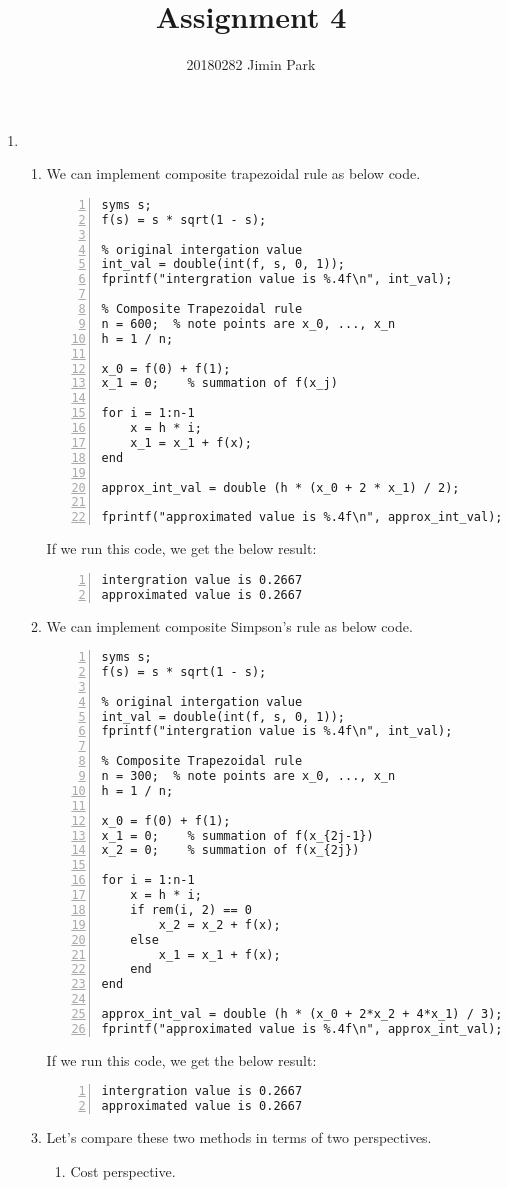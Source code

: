 \documentclass{article}
\begin{document}
\title{Assignment 4}
\author{20180282 Jimin Park}
\maketitle

\begin{enumerate}
    \item \begin{enumerate}[wide=10pt]
        \item We can implement composite trapezoidal rule as below code. \begin{lstlisting}[frame=single, numbers=left, style=Matlab-editor]
syms s;
f(s) = s * sqrt(1 - s);

% original intergation value
int_val = double(int(f, s, 0, 1));
fprintf("intergration value is %.4f\n", int_val);

% Composite Trapezoidal rule
n = 600;  % note points are x_0, ..., x_n
h = 1 / n;

x_0 = f(0) + f(1);
x_1 = 0;    % summation of f(x_j)

for i = 1:n-1
    x = h * i;
    x_1 = x_1 + f(x);
end

approx_int_val = double (h * (x_0 + 2 * x_1) / 2);

fprintf("approximated value is %.4f\n", approx_int_val);
        \end{lstlisting} If we run this code, we get the below result: \begin{lstlisting}[frame=single, numbers=left, style=Matlab-editor]
intergration value is 0.2667
approximated value is 0.2667
        \end{lstlisting}
        \item We can implement composite Simpson's rule as below code. \begin{lstlisting}[frame=single, numbers=left, style=Matlab-editor]
syms s;
f(s) = s * sqrt(1 - s);

% original intergation value
int_val = double(int(f, s, 0, 1));
fprintf("intergration value is %.4f\n", int_val);

% Composite Trapezoidal rule
n = 300;  % note points are x_0, ..., x_n
h = 1 / n;

x_0 = f(0) + f(1);
x_1 = 0;    % summation of f(x_{2j-1})
x_2 = 0;    % summation of f(x_{2j})

for i = 1:n-1
    x = h * i;
    if rem(i, 2) == 0
        x_2 = x_2 + f(x);
    else
        x_1 = x_1 + f(x);
    end
end

approx_int_val = double (h * (x_0 + 2*x_2 + 4*x_1) / 3);
fprintf("approximated value is %.4f\n", approx_int_val);
        \end{lstlisting} If we run this code, we get the below result: \begin{lstlisting}[frame=single, numbers=left, style=Matlab-editor]
intergration value is 0.2667
approximated value is 0.2667
        \end{lstlisting}
        \item Let's compare these two methods in terms of two perspectives. \begin{enumerate}[wide=30pt]
            \item Cost perspective.


\end{enumerate}
\end{enumerate}
\end{enumerate}
\end{document}
